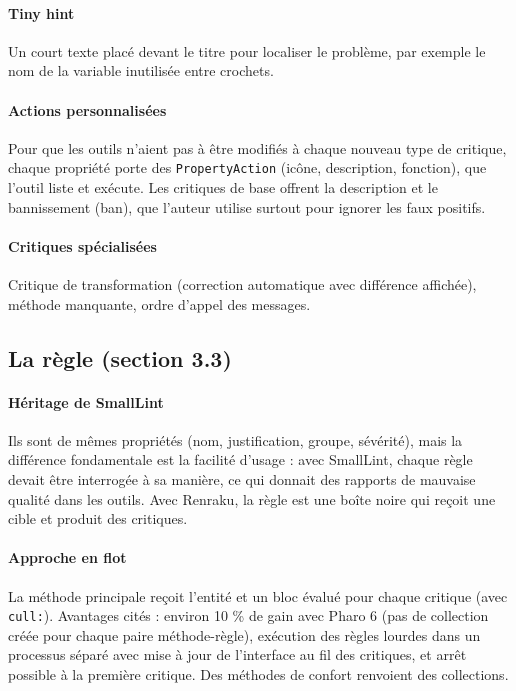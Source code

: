 \documentclass[11pt,a4paper]{article}
\begin{document}
\paragraph{Tiny hint}

Un court texte placé devant le titre pour localiser le problème, par exemple le nom de la variable inutilisée entre crochets.

\paragraph{Actions personnalisées}

Pour que les outils n’aient pas à être modifiés à chaque nouveau type de critique, chaque propriété porte des \texttt{PropertyAction} (icône, description, fonction), que l’outil liste et exécute. Les critiques de base offrent la description et le bannissement (ban), que l’auteur utilise surtout pour ignorer les faux positifs.

\paragraph{Critiques spécialisées}

Critique de transformation (correction automatique avec différence affichée), méthode manquante, ordre d’appel des messages.

\subsection{La règle (section 3.3)}

\paragraph{Héritage de SmallLint}

Ils sont de mêmes propriétés (nom, justification, groupe, sévérité), mais la différence fondamentale est la facilité d’usage : avec SmallLint, chaque règle devait être interrogée à sa manière, ce qui donnait des rapports de mauvaise qualité dans les outils. Avec Renraku, la règle est une boîte noire qui reçoit une cible et produit des critiques.

\paragraph{Approche en flot}

La méthode principale reçoit l’entité et un bloc évalué pour chaque critique (avec \texttt{cull:}). Avantages cités : environ 10 \% de gain avec Pharo 6 (pas de collection créée pour chaque paire méthode-règle), exécution des règles lourdes dans un processus séparé avec mise à jour de l’interface au fil des critiques, et arrêt possible à la première critique. Des méthodes de confort renvoient des collections.
\end{document}

